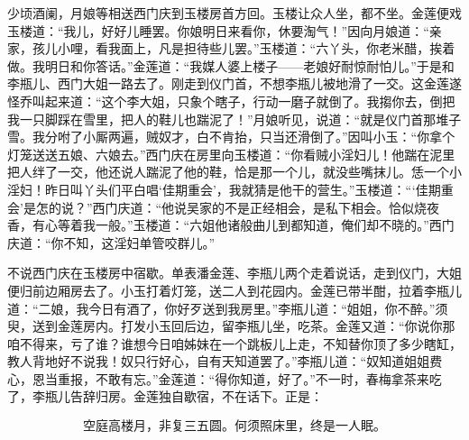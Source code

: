 少顷酒阑，月娘等相送西门庆到玉楼房首方回。玉楼让众人坐，都不坐。金莲便戏玉楼道：“我儿，好好儿睡罢。你娘明日来看你，休要淘气！”因向月娘道：“亲家，孩儿小哩，看我面上，凡是担待些儿罢。”玉楼道：“六丫头，你老米醋，挨着做。我明日和你答话。”金莲道：“我媒人婆上楼子——老娘好耐惊耐怕儿。”于是和李瓶儿、西门大姐一路去了。刚走到仪门首，不想李瓶儿被地滑了一交。这金莲遂怪乔叫起来道：“这个李大姐，只象个瞎子，行动一磨子就倒了。我搊你去，倒把我一只脚踩在雪里，把人的鞋儿也踹泥了！”月娘听见，说道：“就是仪门首那堆子雪。我分咐了小厮两遍，贼奴才，白不肯抬，只当还滑倒了。”因叫小玉：“你拿个灯笼送送五娘、六娘去。”西门庆在房里向玉楼道：“你看贼小淫妇儿！他踹在泥里把人绊了一交，他还说人踹泥了他的鞋，恰是那一个儿，就没些嘴抹儿。恁一个小淫妇！昨日叫丫头们平白唱‘佳期重会’，我就猜是他干的营生。”玉楼道：“‘佳期重会’是怎的说？”西门庆道：“他说吴家的不是正经相会，是私下相会。恰似烧夜香，有心等着我一般。”玉楼道：“六姐他诸般曲儿到都知道，俺们却不晓的。”西门庆道：“你不知，这淫妇单管咬群儿。”

不说西门庆在玉楼房中宿歇。单表潘金莲、李瓶儿两个走着说话，走到仪门，大姐便归前边厢房去了。小玉打着灯笼，送二人到花园内。金莲已带半酣，拉着李瓶儿道：“二娘，我今日有酒了，你好歹送到我房里。”李瓶儿道：“姐姐，你不醉。”须臾，送到金莲房内。打发小玉回后边，留李瓶儿坐，吃茶。金莲又道：“你说你那咱不得来，亏了谁？谁想今日咱姊妹在一个跳板儿上走，不知替你顶了多少瞎缸，教人背地好不说我！奴只行好心，自有天知道罢了。”李瓶儿道：“奴知道姐姐费心，恩当重报，不敢有忘。”金莲道：“得你知道，好了。”不一时，春梅拿茶来吃了，李瓶儿告辞归房。金莲独自歇宿，不在话下。正是：

\[
空庭高楼月，非复三五圆。
何须照床里，终是一人眠。
\]
